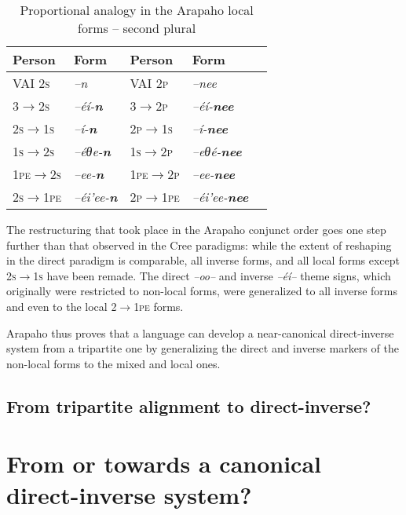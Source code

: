 \documentclass[twoside,a4paper,11pt]{article}
\newcommand{\ipa}[1]{{\phon\textit{#1}}}
\newcommand{\grise}[1]{\cellcolor{lightgray}\textbf{#1}}
\newcommand{\Σ}{\greek{Σ}}
\begin{document}
 
 \begin{table}[H]
\caption{Proportional analogy in the Arapaho local forms -- second plural}
\centering \label{tab:arapaho.analogy.local2}
\begin{tabular}{lllll}
\toprule
 Person &  Form &  Person &  Form\\
\midrule 
 VAI \textsc{2s} & \ipa{--n} &  VAI \textsc{2p} & \ipa{--nee} \\
  \textsc{3$\rightarrow$2s} & \ipa{--éí-\textbf{n}} &   \textsc{3$\rightarrow$2p} & \ipa{--éí-\textbf{nee}} \\
\textsc{2s$\rightarrow$1s}&  \ipa{--í-\textbf{n}} & \textsc{2p$\rightarrow$1s}&  \ipa{--í-\textbf{nee}} \\
   \midrule 
    \textsc{1s$\rightarrow$2s}& \ipa{--éθe-\textbf{n}} & \textsc{1s$\rightarrow$2p}&\ipa{--eθé-\textbf{nee}} \grise{} \\
    \textsc{1pe$\rightarrow$2s}&\ipa{--ee-\textbf{n}} & \textsc{1pe$\rightarrow$2p}&\ipa{--ee-\textbf{nee}}\grise{} \\
    \textsc{2s$\rightarrow$1pe}& \ipa{--éi'ee-\textbf{n}}&\textsc{2p$\rightarrow$1pe}&\ipa{--éi'ee-\textbf{nee}}\grise{}\\
\bottomrule
\end{tabular}
\end{table}
 
The restructuring that took place in the Arapaho conjunct order goes one step further than that observed in the Cree paradigms: while the extent of reshaping in the direct paradigm is comparable, all inverse forms, and   all local forms except \textsc{2s$\rightarrow$1s} have been remade. The direct \ipa{--oo--} and inverse \ipa{--éí--} theme signs, which originally were restricted to non-local forms, were generalized to all inverse forms and even to the local \textsc{2$\rightarrow$1pe} forms.

Arapaho thus proves that a language can develop a near-canonical direct-inverse system from a tripartite one by generalizing the direct and inverse markers of the non-local forms to the mixed and local ones. 

\subsection{From tripartite alignment to direct-inverse?}

\section{From or towards a canonical direct-inverse system?}
\end{document}
